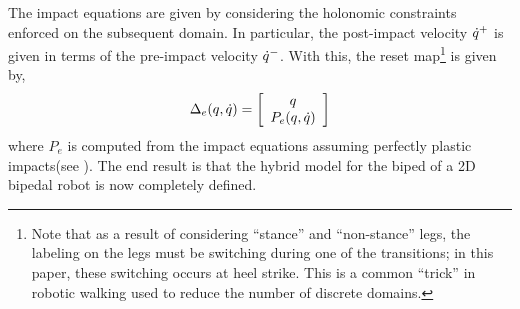 The impact equations are given by considering the holonomic constraints enforced on the subsequent domain.  In particular, the post-impact velocity $\dot {q}^+$ is given in terms of the pre-impact velocity $\dot {q}^-$. With this, the reset map\footnote{Note that as a result of considering ``stance'' and ``non-stance'' legs, the labeling on the legs must be switching during one of the transitions; in this paper, these switching occurs at heel strike.  This is a common ``trick'' in robotic walking used to reduce the number of discrete domains.} is given by,
\begin{align}
 \Delta_e(q,\dot {q}) = \left[
    \begin{array}{c}
      q \\
      P_e(q,\dot {q})
    \end{array}
    \right]
\end{align}
where $P_{e}$ is computed from the impact equations assuming perfectly plastic impacts(see \cite{WGCCM07}). The end result is that the hybrid model for the biped of a 2D bipedal robot is now completely defined.


